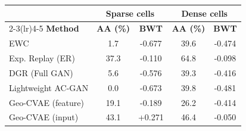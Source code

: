 \begin{tabular}{lcccc}
\toprule
& \multicolumn{2}{c}{\textbf{Sparse cells}} & \multicolumn{2}{c}{\textbf{Dense cells}} \\
\cmidrule(lr){2-3}\cmidrule(lr){4-5}
\textbf{Method} & \textbf{AA (\%)} & \textbf{BWT} & \textbf{AA (\%)} & \textbf{BWT} \\
\midrule
EWC & 1.7 & -0.677 & 39.6 & -0.474 \\
Exp. Replay (ER) & 37.3 & -0.110 & 64.8 & -0.098 \\
DGR (Full GAN) & 5.6 & -0.576 & 39.3 & -0.416 \\
Lightweight AC-GAN & 0.0 & -0.673 & 39.8 & -0.481 \\
Geo-CVAE (feature) & 19.1 & -0.189 & 26.2 & -0.414 \\
Geo-CVAE (input) & 43.1 & +0.271 & 46.4 & -0.050 \\
\bottomrule
\end{tabular}
